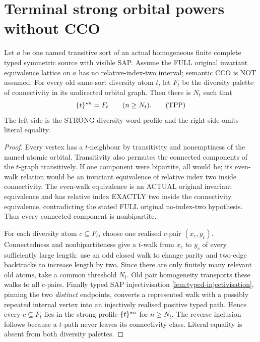 \section{Terminal strong orbital powers without CCO}
\label{sec:foundational-terminal-strong-powers}

\begin{lemma}
\label{lem:typed-terminal-pure-power}
Let $a$ be one named transitive sort of an actual
homogeneous finite complete typed symmetric source
with visible SAP. Assume the FULL original invariant
equivalence lattice on $a$ has no relative-index-two
interval; semantic CCO is NOT assumed. For every old
same-sort diversity atom $t$, let $F_t$ be the diversity
palette of connectivity in its undirected orbital graph.
Then there is $N_t$ such that
\[
                \{t\}^{\mathbin\star n}=F_t
                      \qquad (n\ge N_t).
\tag{TPP}\label{eq:typed-terminal-pure-power}
\]
The left side is the STRONG diversity word profile and
the right side omits literal equality.
\end{lemma}
\begin{proof}
Every vertex has a $t$-neighbour by transitivity and
nonemptiness of the named atomic orbital. Transitivity
also permutes the connected components of the $t$-graph
transitively. If one component were bipartite, all
would be; its even-walk relation would be an invariant
equivalence of relative index two inside connectivity.
The even-walk equivalence is an ACTUAL original
invariant equivalence and has relative index EXACTLY
two inside the connectivity equivalence, contradicting
the stated FULL original no-index-two hypothesis.
Thus every connected component is nonbipartite.

For each diversity atom $c\subseteq F_t$, choose one
realised $c$-pair $(x_c,y_c)$. Connectedness and
nonbipartiteness give a $t$-walk from $x_c$ to $y_c$
of every sufficiently large length: use an odd closed
walk to change parity and two-edge backtracks to
increase length by two. Since there are only finitely
many relevant old atoms, take a common threshold $N_t$.
Old pair homogeneity transports these walks to all
$c$-pairs. Finally typed SAP injectivisation
\cref{lem:typed-injectivisation}, pinning the two
\emph{distinct} endpoints, converts a represented
walk with a possibly repeated internal vertex into
an injectively realised positive typed path.
Hence every $c\subseteq F_t$ lies in the strong
profile $\{t\}^{\mathbin\star n}$ for $n\ge N_t$.
The reverse inclusion follows because a $t$-path
never leaves its connectivity class. Literal equality
is absent from both diversity palettes.
\end{proof}

